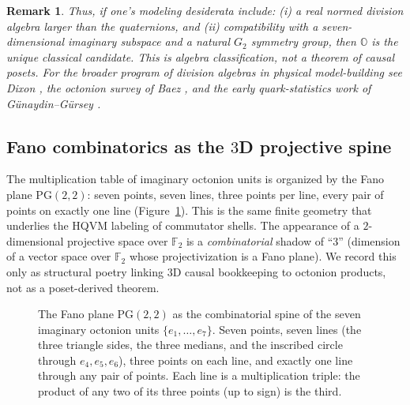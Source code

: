 \documentclass[11pt]{amsart}
\newtheorem{remark}[theorem]{Remark}
\begin{document}
\begin{remark}
Thus, if one's modeling desiderata include: (i) a real normed division algebra larger than the quaternions, and (ii) compatibility with a seven-dimensional imaginary subspace and a natural \(G_2\) symmetry group, then \(\mathbb{O}\) is the unique classical candidate. This is \emph{algebra classification}, not a theorem of causal posets. For the broader program of division algebras in physical model-building see Dixon \cite{Dixon1994}, the octonion survey of Baez \cite{baez2002octonions}, and the early quark-statistics work of G\"unaydin--G\"ursey \cite{Gunaydin1974,Gunaydin1975}.
\end{remark}

\subsection{Fano combinatorics as the \texorpdfstring{\(3\)D}{3D} projective spine}

The multiplication table of imaginary octonion units is organized by the Fano plane \(\mathrm{PG}(2,2)\): seven points, seven lines, three points per line, every pair of points on exactly one line (Figure~\ref{fig:fano-plane}). This is the same finite geometry that underlies the HQVM labeling of commutator shells. The appearance of a \(2\)-dimensional projective space over \(\mathbb{F}_2\) is a \emph{combinatorial} shadow of ``\(3\)'' (dimension of a vector space over \(\mathbb{F}_2\) whose projectivization is a Fano plane). We record this only as structural poetry linking \(3\)D causal bookkeeping to octonion products, not as a poset-derived theorem.

\begin{figure}[ht]
\centering
{}
\caption{The Fano plane \(\mathrm{PG}(2,2)\) as the combinatorial spine of the seven imaginary octonion units \(\{e_1,\dots,e_7\}\). Seven points, seven lines (the three triangle sides, the three medians, and the inscribed circle through \(e_4,e_5,e_6\)), three points on each line, and exactly one line through any pair of points. Each line is a multiplication triple: the product of any two of its three points (up to sign) is the third.}
\label{fig:fano-plane}
\end{figure}
\end{document}
